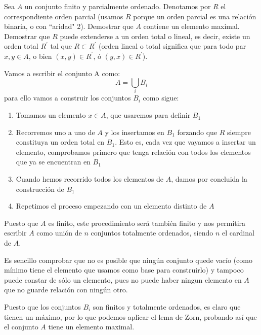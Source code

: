 	\begin{problem}[2]
	Sea $A$ un conjunto finito y parcialmente ordenado. Denotamos por $R$ el correspondiente
	orden parcial (usamos $R$ porque un orden parcial es una relaci\'on binaria, o con ``aridad" 2). Demostrar que
	$A$ contiene un elemento maximal. Demostrar que $R$ puede extenderse a un orden total o lineal,
	es decir, existe un orden total  $R^\prime$ tal que $R\subset R^\prime$ (orden lineal o total
	significa que para todo par
	$x, y\in A$, o bien $(x,y)\in R^\prime$, \'o $(y,x)\in R^\prime$).
	\solution
	
	

	Vamos a escribir el conjunto A como:
	\[A = \bigcup_i B_i\]
	para ello vamos a construir los conjuntos $B_i$ como sigue:
	\begin{enumerate}
	\item Tomamos un elemento $x \in A$, que usaremos para definir $B_1$
	\item Recorremos uno a uno de $A$ y los insertamos en $B_1$ forzando que $R$ siempre constituya un orden total en $B_1$. Esto es, cada vez que vayamos a insertar un elemento, comprobamos primero que tenga relación con todos los elementos que ya se encuentran en $B_1$
	\item Cuando hemos recorrido todos los elementos de $A$, damos por concluida la construcción de $B_1$
	\item Repetimos el proceso empezando con un elemento distinto de $A$
	\end{enumerate}
	
	Puesto que $A$ es finito, este procedimiento será también finito y nos permitira escribir $A$ como unión de $n$ conjuntos totalmente ordenados, siendo $n$ el cardinal de $A$.
	
	Es sencillo comprobar que no es posible que ningún conjunto quede vacío (como mínimo tiene el elemento que usamos como base para construirlo) y tampoco puede constar de sólo un elemento, pues no puede haber ningun elemento en $A$ que no guarde relación con ningún otro.

	Puesto que los conjuntos $B_i$ son finitos y totalmente ordenados, es claro que tienen un máximo, por lo que podemos aplicar el lema de Zorn, probando así que el conjunto $A$ tiene un elemento maximal.


\end{problem}
